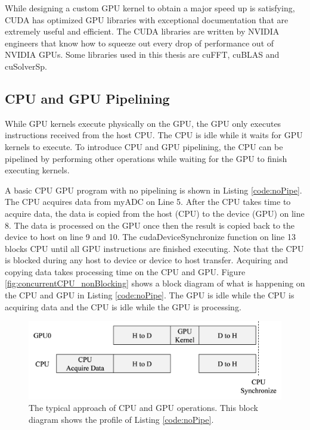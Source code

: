 While designing a custom GPU kernel to obtain a major speed up is satisfying,
CUDA has optimized GPU libraries with exceptional documentation that are extremely useful and efficient.
The CUDA libraries are written by NVIDIA engineers that know how to squeeze out every drop of performance out of NVIDIA GPUs.
Some libraries used in this thesis are cuFFT, cuBLAS and cuSolverSp.

\subsection{CPU and GPU Pipelining}
While GPU kernels execute physically on the GPU, the GPU only executes instructions received from the host CPU.
The CPU is idle while it waits for GPU kernels to execute.
To introduce CPU and GPU pipelining, the CPU can be pipelined by performing other operations while waiting for the GPU to finish executing kernels.

A basic CPU GPU program with no pipelining is shown in Listing \ref{code:noPipe}.
The CPU acquires data from myADC on Line 5.
After the CPU takes time to acquire data, the data is copied from the host (CPU) to the device (GPU) on line 8.
The data is processed on the GPU once then the result is copied back to the device to host on line 9 and 10.
The cudaDeviceSynchronize function on line 13 blocks CPU until all GPU instructions are finished executing.
Note that the CPU is blocked during any host to device or device to host transfer.
Acquiring and copying data takes processing time on the CPU and GPU.
Figure \ref{fig:concurrentCPU_nonBlocking} shows a block diagram of what is happening on the CPU and GPU in Listing \ref{code:noPipe}.
The GPU is idle while the CPU is acquiring data and the CPU is idle while the GPU is processing.
\begin{figure}
	\centering\includegraphics[width=8.77in/100*55]{figures/gpu_intro/concurrentCPU_blocking.pdf}
	\caption{The typical approach of CPU and GPU operations. This block diagram shows the profile of Listing \ref{code:noPipe}.}
	\label{fig:concurrentCPU_blocking}
\end{figure}

